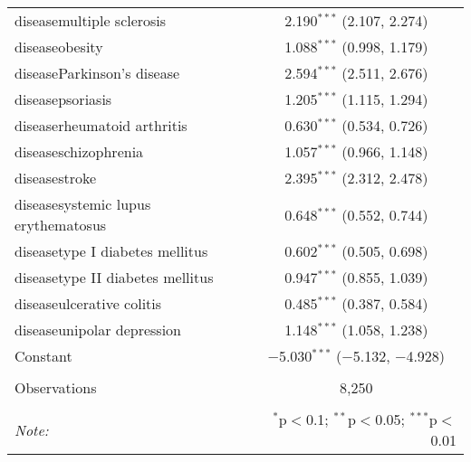 \begin{table}[!htbp]
\begin{tabular}{@{\extracolsep{5pt}}lc}
  diseasemultiple sclerosis & 2.190$^{***}$ (2.107, 2.274) \\ 
  diseaseobesity & 1.088$^{***}$ (0.998, 1.179) \\ 
  diseaseParkinson's disease & 2.594$^{***}$ (2.511, 2.676) \\ 
  diseasepsoriasis & 1.205$^{***}$ (1.115, 1.294) \\ 
  diseaserheumatoid arthritis & 0.630$^{***}$ (0.534, 0.726) \\ 
  diseaseschizophrenia & 1.057$^{***}$ (0.966, 1.148) \\ 
  diseasestroke & 2.395$^{***}$ (2.312, 2.478) \\ 
  diseasesystemic lupus erythematosus & 0.648$^{***}$ (0.552, 0.744) \\ 
  diseasetype I diabetes mellitus & 0.602$^{***}$ (0.505, 0.698) \\ 
  diseasetype II diabetes mellitus & 0.947$^{***}$ (0.855, 1.039) \\ 
  diseaseulcerative colitis & 0.485$^{***}$ (0.387, 0.584) \\ 
  diseaseunipolar depression & 1.148$^{***}$ (1.058, 1.238) \\ 
  Constant & $-$5.030$^{***}$ ($-$5.132, $-$4.928) \\ 
 \hline \\[-1.8ex] 
Observations & 8,250 \\ 
\hline 
\hline \\[-1.8ex] 
\textit{Note:}  & \multicolumn{1}{r}{$^{*}$p$<$0.1; $^{**}$p$<$0.05; $^{***}$p$<$0.01} \\ 
\end{tabular} 
\end{table} 
